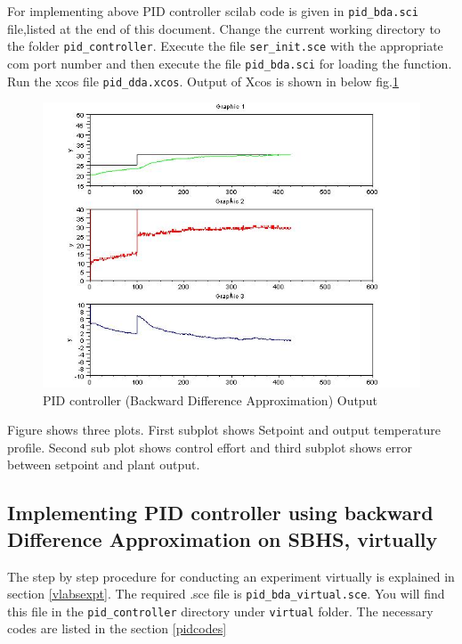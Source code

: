 For implementing above PID controller scilab code is given in {\tt pid\_bda.sci} file,listed at the end of this document. Change the current working directory to the folder {\tt pid\_controller}. Execute the file {\tt ser\_init.sce} with the appropriate com port number and then execute the file {\tt pid\_bda.sci} for loading the function. Run the xcos file {\tt pid\_dda.xcos}. Output of Xcos is shown in below fig.\ref{pid_bda}
\begin{figure}
\centering
\includegraphics[width=0.7\linewidth]{pid_manual/pid_bda_graph}
\caption{PID controller (Backward Difference Approximation) Output}
\label{pid_bda}
\end{figure}
 Figure shows three plots. First subplot shows Setpoint and output temperature profile. Second sub plot shows control effort and third subplot shows error between setpoint and plant output.

\subsection{Implementing PID controller using backward Difference Approximation on SBHS, virtually}
The step by step procedure for conducting an experiment virtually is explained in section \ref{vlabsexpt}. The required .sce file is {\tt pid\_bda\_virtual.sce}.  You will find this file in the {\tt pid\_controller} directory under {\tt virtual} folder.  The necessary codes are listed in the section \ref{pidcodes}

